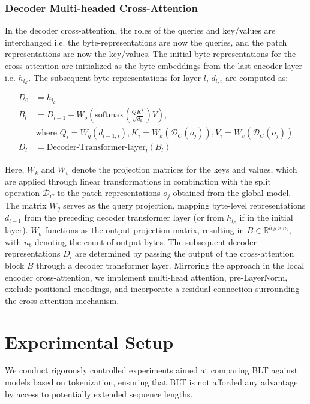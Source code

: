 \subsubsection{Decoder Multi-headed Cross-Attention} 

In the decoder cross-attention, the roles of the queries and key/values are interchanged i.e. the byte-representations are now the queries, and the patch representations are now the key/values. The initial byte-representations for the cross-attention are initialized as the byte embeddings from the last encoder layer i.e. $h_{l_{\mathcal{E}}}$. The subsequent byte-representations for layer $l$, $d_{l,i}$ are computed as:

\begin{align}
D_0 &= h_{l_{\mathcal{E}}} \\
B_l &= D_{l-1} + W_o\left(\text{softmax}\left(\frac{QK^T}{\sqrt{d_k}}\right)V\right), \\
  &\text{where } Q_i = W_q(d_{l-1,i}), K_i = W_k(\mathcal{D}_C(o_j)), V_i = W_v(\mathcal{D}_C(o_j)) \\
  D_l &= \text{Decoder-Transformer-layer}_l(B_l)
\end{align}

Here, $W_k$ and $W_v$ denote the projection matrices for the keys and values, which are applied through linear transformations in combination with the split operation $\mathcal{D}_C$ to the patch representations $o_j$ obtained from the global model. The matrix $W_q$ serves as the query projection, mapping byte-level representations $d_{l-1}$ from the preceding decoder transformer layer (or from $h_{l_{\mathcal{E}}}$ if in the initial layer). $W_o$ functions as the output projection matrix, resulting in $B \in \mathbb{R}^{h_{\mathcal{D}} \times n_b}$, with $n_b$ denoting the count of output bytes. The subsequent decoder representations $D_l$ are determined by passing the output of the cross-attention block $B$ through a decoder transformer layer. Mirroring the approach in the local encoder cross-attention, we implement multi-head attention, pre-LayerNorm, exclude positional encodings, and incorporate a residual connection surrounding the cross-attention mechanism.

\section{Experimental Setup}
\label{section:experiments}
We conduct rigorously controlled experiments aimed at comparing {\textsc BLT} against models based on tokenization, ensuring that {\textsc BLT} is not afforded any advantage by access to potentially extended sequence lengths.

